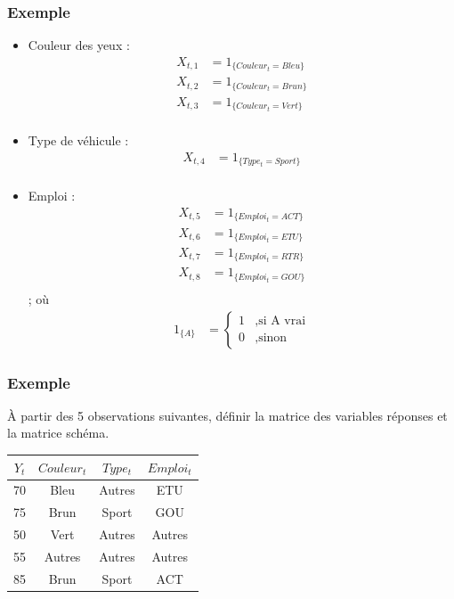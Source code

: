 \documentclass[11pt,french]{report}
\begin{document}
\subsubsection*{Exemple}
\begin{itemize}
\item Couleur des yeux : 
\begin{align*}
X_{t,1} &= 1_{\{Couleur_t = Bleu\}} \\
X_{t,2} &= 1_{\{Couleur_t = Brun\}} \\
X_{t,3} &= 1_{\{Couleur_t = Vert\}} \\
\end{align*}
\item Type de véhicule :
\begin{align*}
X_{t,4} &= 1_{\{Type_t = Sport\}} \\
\end{align*}
\item Emploi :
\begin{align*}
X_{t,5} &= 1_{\{Emploi_t = ACT\}} \\
X_{t,6} &= 1_{\{Emploi_t = ETU\}} \\
X_{t,7} &= 1_{\{Emploi_t = RTR\}} \\
X_{t,8} &= 1_{\{Emploi_t = GOU\}} \\
\end{align*}
; où 
\begin{align*}
1_{\{A\}} &= 
\left \lbrace
     \begin{array}{rl}
     1 &, \text{si A vrai} \\
     0 &, \text{sinon}
     \end{array}
     \right.
\end{align*}

\end{itemize}

\subsubsection*{Exemple}
À partir des 5 observations suivantes, définir la matrice des variables réponses et la matrice schéma.

\bigskip
\begin{center}
\begin{tabular}{|c|c|c|c|}
\hline
$Y_t$ & $Couleur_t$ & $Type_t$ & $Emploi_t$ \\
\hline
70 & Bleu & Autres & ETU \\
75 & Brun & Sport & GOU \\
50 & Vert & Autres & Autres \\
55 & Autres & Autres & Autres \\
85 & Brun & Sport & ACT \\
\hline
\end{tabular}
\end{center}
\bigskip
\end{document}
